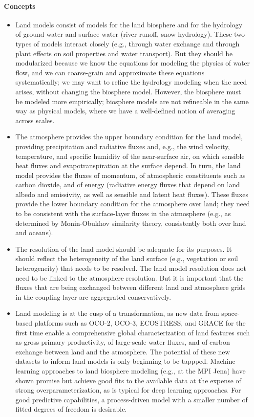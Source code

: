 \documentclass{article}
\begin{document}
\paragraph{Concepts}
\begin{itemize}
    \item Land models consist of models for the land biosphere and for the hydrology of ground water and surface water (river runoff, snow hydrology). These two types of models interact closely (e.g., through water exchange and through plant effects on soil properties and water transport). But they should be modularized because we know the equations for modeling the physics of water flow, and we can coarse-grain and approximate these equations systematically; we may want to refine the hydrology modeling when the need arises, without changing the biosphere model. However, the biosphere must be modeled more empirically; biosphere models are not refineable in the same way as physical models, where we have a well-defined notion of averaging across scales. 
    \item The atmosphere provides the upper boundary condition for the land model, providing precipitation and radiative fluxes and, e.g., the wind velocity, temperature, and specific humidity of the near-surface air, on which sensible heat fluxes and evapotranspiration at the surface depend. In turn, the land model provides the fluxes of momentum, of atmospheric constituents such as carbon dioxide, and of energy (radiative energy fluxes that depend on land albedo and emissivity, as well as sensible and latent heat fluxes). These fluxes provide the lower boundary condition for the atmosphere over land; they need to be consistent with the surface-layer fluxes in the atmosphere (e.g., as determined by Monin-Obukhov similarity theory, consistently both over land and oceans).
    \item The resolution of the land model should be adequate for its purposes. It should reflect the heterogeneity of the land surface (e.g., vegetation or soil heterogeneity) that needs to be resolved. The land model resolution does not need to be linked to the atmosphere resolution. But it is important that the fluxes that are being exchanged between different land and atmosphere grids in the coupling layer are aggregrated conservatively. 
    \item Land modeling is at the cusp of a transformation, as new data from space-based platforms such as OCO-2, OCO-3, ECOSTRESS, and GRACE for the first time enable a comprehensive global characterization of land features such as gross primary productivity, of large-scale water fluxes, and of carbon exchange between land and the atmosphere. The potential of these new datasets to inform land models is only beginning to be tappped. Machine learning approaches to land biosphere modeling (e.g., at the MPI Jena) have shown promise but achieve good fits to the available data at the expense of strong overparameterization, as is typical for deep learning approaches. For good predictive capabilities, a process-driven model with a smaller number of fitted degrees of freedom is desirable. 

\end{itemize}
\end{document}
